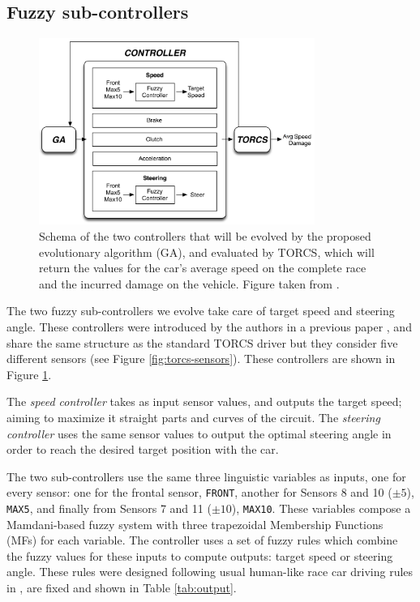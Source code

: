 \documentclass[10pt,journal,compsoc]{IEEEtran}
\begin{document}
\subsection{Fuzzy sub-controllers}
\label{subsec:fuzzy-controllers}

\begin{figure}[!ht]
  \begin{center}
    \includegraphics[width=9cm]{fig/flowchart}
  \end{center}
  \caption{Schema of the two controllers that will be evolved by the proposed 
    evolutionary algorithm (GA), and evaluated by TORCS, which will
    return the values for the car's average speed on the complete race and the incurred damage on the vehicle. Figure taken from \cite{salem_evo18}.  \label{fig:ga}}
\end{figure}
%
The two fuzzy sub-controllers we evolve take care of target speed and steering angle. These controllers were introduced by the authors in a previous paper \cite{salem_evo17}, and share the same structure as the standard TORCS driver but they consider five different sensors (see Figure \ref{fig:torcs-sensors}). These controllers are shown in Figure \ref{fig:ga}. 


The \textit{speed controller} takes as input sensor values, and
outputs the target speed; aiming to maximize it straight parts and curves of the circuit. The \textit{steering controller} uses the same sensor values to output the optimal steering angle in order to reach the desired target position with the car.

The two sub-controllers use the same three linguistic variables as
inputs, one for every sensor: one for the frontal sensor,
\texttt{FRONT}, another for Sensors 8 and 10 ($\pm 5$\textdegree),
\texttt{MAX5}, and finally from Sensors 7 and 11 ($\pm
10$\textdegree), \texttt{MAX10}. These variables compose a Mamdani-based fuzzy
system \cite{iancu2012} with three trapezoidal Membership Functions
(MFs) for each variable. The controller uses a set of fuzzy rules
which combine the fuzzy values for these inputs to compute outputs:
target speed or steering angle.
% 
These rules were designed following usual human-like race car driving
rules in \cite{salem_evo18}, are fixed and shown in Table \ref{tab:output}.
\end{document}
